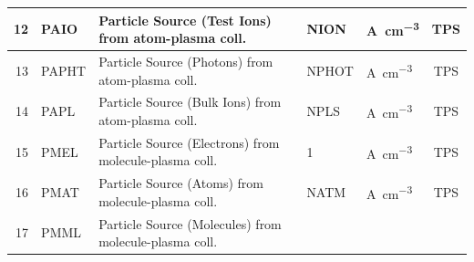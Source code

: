 \begin{landscape}
\begin{longtable}{|r|l|l|l|l|c|}
    \\  \hline
    12                                                             & PAIO
                                                                   & Particle Source (Test
    Ions) from atom-plasma coll.
                                                                   & NION
                                                                   &
    \si{\ampere\per\cubic\centi\metre}                             & TPS
    \\  \hline
    13                                                             & PAPHT
                                                                   & Particle Source (Photons)
    from atom-plasma coll.
                                                                   & NPHOT
                                                                   &
    \si{\ampere\per\cubic\centi\metre}                             & TPS
    \\  \hline
    14                                                             & PAPL
                                                                   & Particle Source (Bulk
    Ions) from atom-plasma coll.
                                                                   & NPLS
                                                                   &
    \si{\ampere\per\cubic\centi\metre}                             & TPS
    \\  \hline
    15                                                             & PMEL
                                                                   & Particle Source
    (Electrons) from molecule-plasma coll.
                                                                   & 1
                                                                   &
    \si{\ampere\per\cubic\centi\metre}                             & TPS
    \\  \hline
    16                                                             & PMAT
                                                                   & Particle Source (Atoms)
    from molecule-plasma coll.
                                                                   & NATM
                                                                   &
    \si{\ampere\per\cubic\centi\metre}                             & TPS
    \\  \hline
    17                                                             & PMML
                                                                   & Particle Source
    (Molecules) from molecule-plasma coll.

\end{longtable}
\end{landscape}
